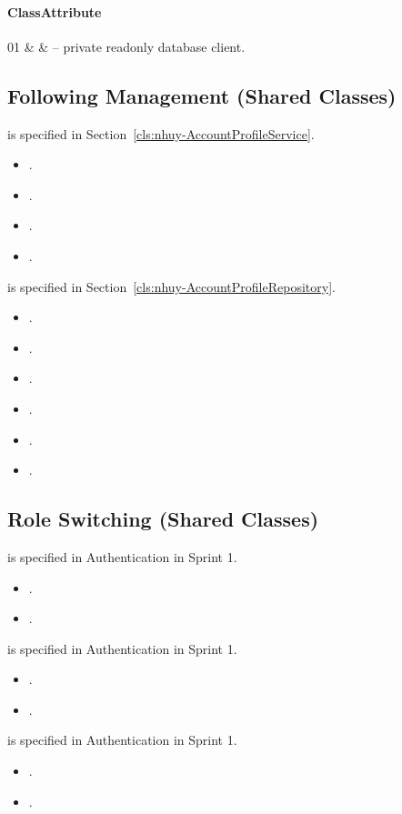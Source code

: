 \paragraph{ClassAttribute}
\begin{ClassAttributeTable}
01 &  &  -- private readonly database client. \\ \hline
\end{ClassAttributeTable}

\subsection{Following Management (Shared Classes)}

 is specified in Section~\ref{cls:nhuy-AccountProfileService}.
\begin{itemize}[nosep]
\item {}.
\item {}.
\item {}.
\item {}.
\end{itemize}

 is specified in Section~\ref{cls:nhuy-AccountProfileRepository}.
\begin{itemize}[nosep]
\item {}.
\item {}.
\item {}.
\item {}.
\item {}.
\item {}.
\end{itemize}

\subsection{Role Switching (Shared Classes)}

 is specified in Authentication in Sprint 1.
\begin{itemize}[nosep]
\item {}.
\item {}.
\end{itemize}

 is specified in Authentication in Sprint 1.
\begin{itemize}[nosep]
\item {}.
\item {}.
\end{itemize}

 is specified in Authentication in Sprint 1.
\begin{itemize}[nosep]
\item {}.
\item {}.
\end{itemize}
